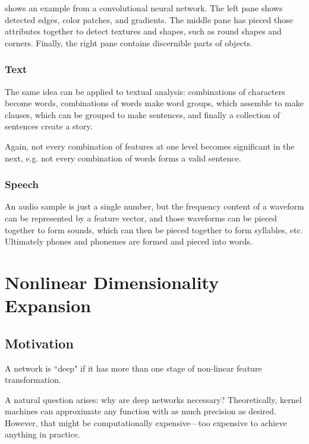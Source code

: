  shows an example from a convolutional neural network.
The left pane shows detected edges, color patches, and gradients.
The middle pane has pieced those attributes together to detect textures and shapes, such as round shapes and corners.
Finally, the right pane contains discernible parts of objects.

\subsection{Text}

The same idea can be applied to textual analysis: combinations of characters become words, combinations of words make word groups, which assemble to make clauses, which can be grouped to make sentences, and finally a collection of sentences create a story.

Again, not every combination of features at one level becomes significant in the next, e.g. not every combination of words forms a valid sentence.

\subsection{Speech}

An audio sample is just a single number, but the frequency content of a waveform can be represented by a feature vector, and those waveforms can be pieced together to form sounds, which can then be pieced together to form syllables, etc.
Ultimately phones and phonemes are formed and pieced into words.

\chapter{Nonlinear Dimensionality Expansion}

\section{Motivation}

A network is ``deep" if it has more than one stage of non-linear feature transformation.

A natural question arises: why are deep networks necessary?
Theoretically, kernel machines can approximate any function with as much precision as desired.
However, that might be computationally expensive---too expensive to achieve anything in practice.

